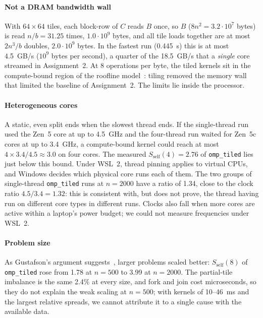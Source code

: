 \documentclass[conference,a4paper]{IEEEtran}
\newcommand{\code}[1]{\texttt{#1}}
\newcommand{\ompk}{\code{omp\_tiled}}
\newcommand{\Sself}{S_{\mathrm{self}}}
\begin{document}
\paragraph{Not a DRAM bandwidth wall} With $64 \times 64$ tiles, each
block-row of $C$ reads $B$ once, so $B$ ($8n^2 = 3.2 \cdot 10^7$ bytes) is read
$n/b = 31.25$ times, $1.0 \cdot 10^9$ bytes, and all tile loads together are
at most $2n^3/b$ doubles, $2.0 \cdot 10^9$ bytes. In the fastest run (0.445~s)
this is at most 4.5~GB/s ($10^9$ bytes per second), a quarter of the 18.5~GB/s
that a \emph{single} core streamed in Assignment~2. At 8 operations
per byte, the tiled kernels sit in the compute-bound region of the roofline
model~\cite{williams2009}: tiling removed the memory wall that limited the
baseline of Assignment~2. The limits lie inside the processor.

\paragraph{Heterogeneous cores} A static, even split ends when the slowest
thread ends. If the single-thread run used the Zen~5 core at up to 4.5~GHz and
the four-thread run waited for Zen~5c cores at up to 3.4~GHz, a compute-bound
kernel could reach at most $4 \times 3.4/4.5 \approx 3.0$ on four cores. The
measured $\Sself(4) = 2.76$ of \ompk{} lies just below this bound. Under
WSL~2, thread pinning applies to virtual CPUs, and Windows decides which
physical core runs each of them. The two groups of single-thread \ompk{} runs
at $n = 2000$ have a ratio of 1.34, close to the clock ratio $4.5/3.4 = 1.32$:
this is consistent with, but does not prove, the thread having run on
different core types in different runs. Clocks also fall when more cores are
active within a laptop's power budget; we could not measure frequencies under
WSL~2.

\paragraph{Problem size} As Gustafson's argument suggests~\cite{gustafson1988},
larger problems scaled better: $\Sself(8)$ of \ompk{} rose from 1.78 at
$n = 500$ to 3.99 at $n = 2000$. The partial-tile imbalance is the same 2.4\%
at every size, and fork and join cost microseconds, so they do not explain the
weak scaling at $n = 500$; with kernels of 10--46~ms and the largest relative
spreads, we cannot attribute it to a single cause with the available data.
\end{document}
